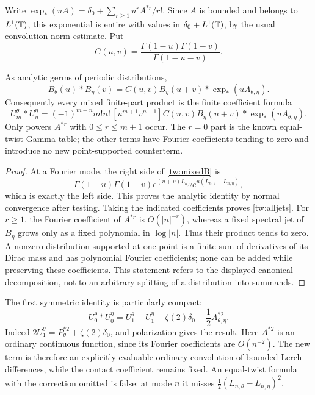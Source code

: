 Write $\exp_*(uA)=\delta_0+\sum_{r\ge1}u^r A^{*r}/r!$.
Since $A$ is bounded and belongs to $L^1(\mathbb T)$, this exponential is
entire with values in $\delta_0+L^1(\mathbb T)$, by the usual convolution
norm estimate. Put
\begin{equation}
 C(u,v)=\frac{\Gamma(1-u)\Gamma(1-v)}{\Gamma(1-u-v)}.
 \label{tw:C}
\end{equation}

\begin{theorem}
\label{tw:jets}
As analytic germs of periodic distributions,
\begin{equation}
 B_\theta(u)*B_\eta(v)
       =C(u,v)B_\eta(u+v)*\exp_*(uA_{\theta,\eta}).
 \label{tw:mixedB}
\end{equation}
Consequently every mixed finite-part product is the finite coefficient
formula
\begin{equation}
 U_m^\theta*U_n^\eta
  =(-1)^{m+n}m!n!\,[u^{m+1}v^{n+1}]
       C(u,v)B_\eta(u+v)*\exp_*(uA_{\theta,\eta}).
 \label{tw:alljets}
\end{equation}
Only powers $A^{*r}$ with $0\le r\le m+1$ occur. The $r=0$
part is the known equal-twist Gamma table; the other terms have Fourier
coefficients tending to zero and introduce no new point-supported
counterterm.
\end{theorem}

\begin{proof}
At a Fourier mode, the right side of \eqref{tw:mixedB} is
\[
 \Gamma(1-u)\Gamma(1-v)
      e^{(u+v)L_{n,\eta}}
      e^{u(L_{n,\theta}-L_{n,\eta})},
\]
which is exactly the left side. This proves the analytic identity by
normal convergence after testing. Taking the indicated coefficients
proves \eqref{tw:alljets}. For $r\ge1$, the Fourier coefficient of
$A^{*r}$ is $O(|n|^{-r})$, whereas a fixed spectral jet of
$B_\eta$ grows only as a fixed polynomial in $\log|n|$. Thus their
product tends to zero. A nonzero distribution supported at one point
is a finite sum of derivatives of its Dirac mass and has polynomial
Fourier coefficients; none can be added while preserving these
coefficients. This statement refers to the displayed canonical
decomposition, not to an arbitrary splitting of a distribution into
summands.
\end{proof}

The first symmetric identity is particularly compact:
\begin{equation}
 \boxed{\quad
 U_0^\theta*U_0^\eta
   =U_1^\theta+U_1^\eta-\zeta(2)\delta_0
                     -\frac12 A_{\theta,\eta}^{*2}.
 \quad}
 \label{tw:firstmixed}
\end{equation}
Indeed $2U_1^\theta=P_\theta^{*2}+\zeta(2)\delta_0$,
and polarization gives the result. Here $A^{*2}$ is an ordinary
continuous function, since its Fourier coefficients are $O(n^{-2})$.
The new term is therefore an explicitly evaluable ordinary convolution
of bounded Lerch differences, while the contact coefficient remains
fixed. An equal-twist formula with the correction omitted is false:
at mode $n$ it misses $\tfrac12(L_{n,\theta}-L_{n,\eta})^2$.

